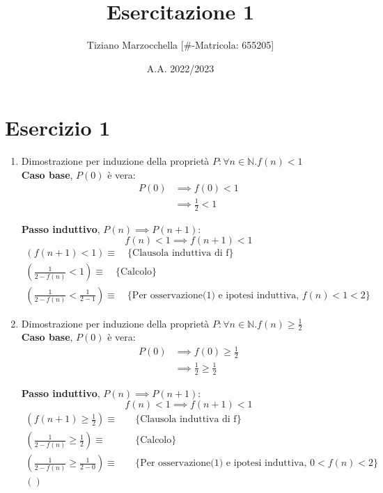 \documentclass{article}
\title{Esercitazione 1}
\author{Tiziano Marzocchella [#-Matricola: 655205]}
\date{A.A. 2022/2023}
\begin{document}
\section{Esercizio 1}
\begin{enumerate}
    \item Dimostrazione per induzione della proprietà \(P: \forall n \in \mathbb{N} . f(n) < 1\) \\
          \textbf{Caso base}, \(P(0)\) è vera:
          \begin{align*}
              P(0) & \implies f(0) < 1        \\
                   & \implies \frac{1}{2} < 1
          \end{align*}

          \textbf{Passo induttivo}, \(P(n) \implies P(n + 1)\):
          \[f(n) < 1 \implies f(n + 1) < 1\]
          \begin{align*}
              (f(n + 1) < 1) \equiv \quad \text{\{Clausola induttiva di f\}} \\
              (\frac{1}{2 - f(n)} < 1) \equiv \quad \text{\{Calcolo\}}  \\
              (\frac{1}{2 - f(n)} < \frac{1}{2 - 1}) \equiv \quad \text{\{Per osservazione(1) e ipotesi induttiva, \(f(n) < 1 < 2\)\}}
          \end{align*}

    \item Dimostrazione per induzione della proprietà \(P: \forall n \in \mathbb{N} . f(n) \geq \frac{1}{2}\) \\
          \textbf{Caso base}, \(P(0)\) è vera:
          \begin{align*}
              P(0) & \implies f(0) \geq \frac{1}{2} \\
                   & \implies \frac{1}{2} \geq \frac{1}{2}
          \end{align*}

          \textbf{Passo induttivo}, \(P(n) \implies P(n + 1)\):
          \[f(n) < 1 \implies f(n + 1) < 1\]
          \begin{align*}
              \left(f(n + 1) \geq \frac{1}{2}\right)               \equiv & \quad \text{\{Clausola induttiva di f\}} \\
              \left(\frac{1}{2 - f(n)} \geq \frac{1}{2}\right)     \equiv & \quad \text{\{Calcolo\}} \\
              \left(\frac{1}{2 - f(n)} \geq \frac{1}{2 - 0}\right) \equiv & \quad \text{\{Per osservazione(1) e ipotesi induttiva, \(0 < f(n) < 2\)\}} \\
              \left(\right)
          \end{align*}
\end{enumerate}
\end{document}
